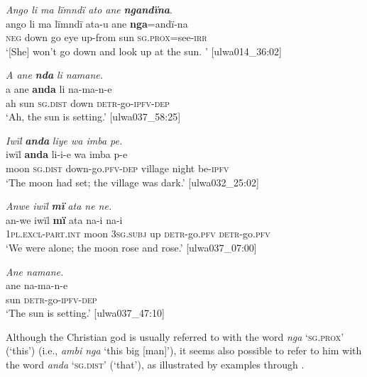 \ea%
    \label{ex:det:120}
          \textit{Ango li ma lïmndï ato ane} \textbf{\textit{ngandïna}}.\\
\gll ango  li    ma  lïmndï  ata-u    ane  \textbf{nga}=andï-na\\
    \textsc{neg}  down  go  eye    up-from  sun  \textsc{sg.prox}=see{}-\textsc{irr}\\
\glt `[She] won’t go down and look up at the sun. ’ [ulwa014\_36:02]
\z

\ea%
    \label{ex:det:121}
          \textit{A ane} \textbf{\textit{nda}} \textit{li namane.}\\
\gll    a  ane  \textbf{anda}    li    na-ma-n-e\\
    ah  sun  \textsc{sg.dist}  down  \textsc{detr-}go-\textsc{ipfv-dep}\\
\glt `Ah, the sun is setting.’ [ulwa037\_58:25]
\z

\ea%
    \label{ex:det:122}
          \textit{Iwïl} \textbf{\textit{anda}} \textit{liye wa imba pe.}\\
\gll    iwïl  \textbf{anda}    li-i-e        wa    imba  p-e\\
    moon  \textsc{sg.dist}  down-go.\textsc{pfv-dep}  village  night  be\textsc{{}-ipfv}\\
\glt `The moon had set; the village was dark.’ [ulwa032\_25:02]
\z

\ea%
    \label{ex:det:123}
          \textit{Anwe iwïl} \textbf{\textit{mï}} \textit{ata ne ne.}\\
\gll    an-we          iwïl  \textbf{mï}      ata  na-i na-i\\
    1\textsc{pl.excl-part.int}  moon  3\textsc{sg.subj}  up  \textsc{detr-}go.\textsc{pfv}    \textsc{detr-}go.\textsc{pfv}\\
\glt `We were alone; the moon rose and rose.’ [ulwa037\_07:00]
\z


\ea%
    \label{ex:det:124}
          \textit{Ane namane.}\\
\gll    ane  na-ma-n-e\\
    sun  \textsc{detr-}go-\textsc{ipfv-dep}\\
\glt `The sun is setting.’ [ulwa037\_47:10]
\z

Although the Christian god is usually referred to with the   word \textit{nga} ‘\textsc{sg.prox}’ (‘this’) (i.e., \textit{ambi nga} ‘this big [man]’), it seems also possible to refer to him with the   word \textit{anda} ‘\textsc{sg.dist}’ (‘that’), as illustrated by examples  through .

